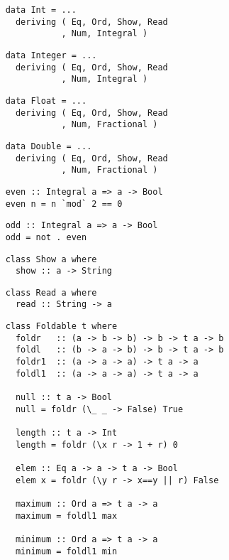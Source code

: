 \begin{multicols}{2}
	\begin{verbatim}
	data Int = ...
	  deriving ( Eq, Ord, Show, Read
	           , Num, Integral )
	\end{verbatim}
	
	\begin{verbatim}
	data Integer = ...
	  deriving ( Eq, Ord, Show, Read
	           , Num, Integral )
	\end{verbatim}
	
	\begin{verbatim}
	data Float = ...
	  deriving ( Eq, Ord, Show, Read
	           , Num, Fractional )
	\end{verbatim}
	
	\begin{verbatim}
	data Double = ...
	  deriving ( Eq, Ord, Show, Read
	           , Num, Fractional )
	\end{verbatim}
	
	\begin{verbatim}
	even :: Integral a => a -> Bool 
	even n = n `mod` 2 == 0
	\end{verbatim}
	
	\begin{verbatim}
	odd :: Integral a => a -> Bool 
	odd = not . even
	\end{verbatim}
	
	\begin{verbatim}
	class Show a where
	  show :: a -> String
	\end{verbatim}
	
	\begin{verbatim}
	class Read a where 
	  read :: String -> a
	\end{verbatim}
	
	\begin{verbatim}
	class Foldable t where
	  foldr   :: (a -> b -> b) -> b -> t a -> b
	  foldl   :: (b -> a -> b) -> b -> t a -> b
	  foldr1  :: (a -> a -> a) -> t a -> a
	  foldl1  :: (a -> a -> a) -> t a -> a
	  
	  null :: t a -> Bool 
	  null = foldr (\_ _ -> False) True
	  
	  length :: t a -> Int
	  length = foldr (\x r -> 1 + r) 0
	  
	  elem :: Eq a -> a -> t a -> Bool 
	  elem x = foldr (\y r -> x==y || r) False
	  
	  maximum :: Ord a => t a -> a 
	  maximum = foldl1 max
	  
	  minimum :: Ord a => t a -> a 
	  minimum = foldl1 min
	  

\end{verbatim}
\end{multicols}
